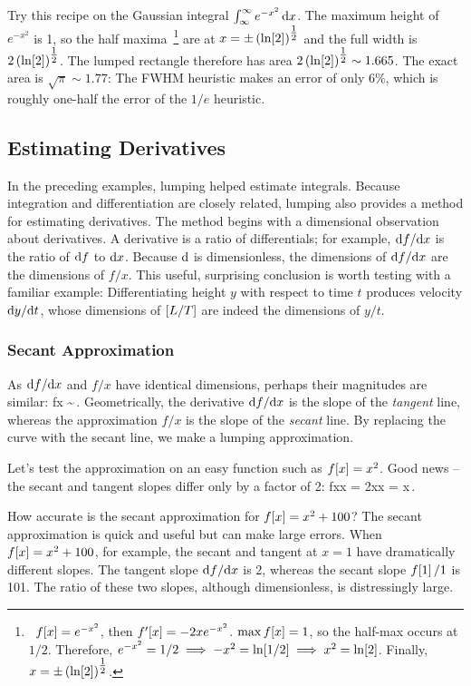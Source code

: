Try this recipe on the Gaussian integral $\int_\infty^\infty e^{-x^2}\,\text{d} x$. The maximum height of $e^{-x^2}$ is 1, so the half maxima~\footnote{~$f\!\left[{x}\right] = e^{-x^2}$, then $f'\!\left[{x}\right] = -2xe^{-x^2}$. $\max f\!\left[{x}\right] = 1$, so the half-max occurs at $1/2$. Therefore, $e^{-x^2} = 1/2\implies -x^2 = \ln\!\left[{1/2}\right]\implies x^2 = \ln\!\left[{2}\right]$. Finally, $x = \pm \left({\ln\!\left[{2}\right]}\right)^{\tfrac{1}{2}}$.} are at $x = \pm\left({\ln\!\left[{2}\right]}\right)^{\tfrac{1}{2}}$ and the full width is $2\left({\ln\!\left[{2}\right]}\right)^{\tfrac{1}{2}}$. The lumped rectangle therefore has area $2\left({\ln\!\left[{2}\right]}\right)^{\tfrac{1}{2}}\sim 1.665$. The exact area is $\sqrt{\pi}\sim 1.77$: The FWHM heuristic makes an error of only 6\%, which is roughly one-half the error of the $1/e$ heuristic.


\subsection{Estimating Derivatives}
In the preceding examples, lumping helped estimate integrals. Because integration and differentiation are closely related, lumping also provides a method for estimating derivatives. The method begins with a dimensional observation about derivatives. A derivative is a ratio of differentials; for example, $\text{d} f/\text{d} x$ is the ratio of $\text{d} f$ to $\text{d} x$. Because $\text{d}{}$ is dimensionless, the dimensions of $\text{d} f/\text{d} x$ are the dimensions of $f/x$. This useful, surprising conclusion is worth testing with a familiar example: Differentiating height $y$ with respect to time $t$ produces velocity $\text{d} y/\text{d} t$, whose dimensions of $\left[{L/T}\right]$ are indeed the dimensions of $y/t$.


\subsubsection{Secant Approximation}
As $\text{d} f/\text{d} x$ and $f/x$ have identical dimensions, perhaps their magnitudes are similar:
\beq
\xod fx \sim {}\,.
\eeq
Geometrically, the derivative $\text{d} f/\text{d} x$  is the slope of the \emph{tangent} line, whereas the approximation $f/x$ is the slope of the \emph{secant} line. By replacing the curve with the secant line, we make a lumping approximation.

Let's test the approximation on an easy function such as $f\!\left[{x}\right] = x^2$. Good news -- the secant and tangent slopes differ only by a factor of 2:
\beq
\xod fx\vat x = 2x\qquad{}\qquad {}\vat x = x\,.
\eeq

How accurate is the secant approximation for $f\!\left[{x}\right] = x^2 + 100$? The secant approximation is quick and useful but can make large errors. When $f\!\left[{x}\right] = x^2 + 100$, for example, the secant and tangent at $x = 1$ have dramatically different slopes. The tangent slope $\text{d} f/\text{d} x$ is 2, whereas the secant slope $f\!\left[{1}\right]/1$ is 101. The ratio of these two slopes, although dimensionless, is distressingly large.

